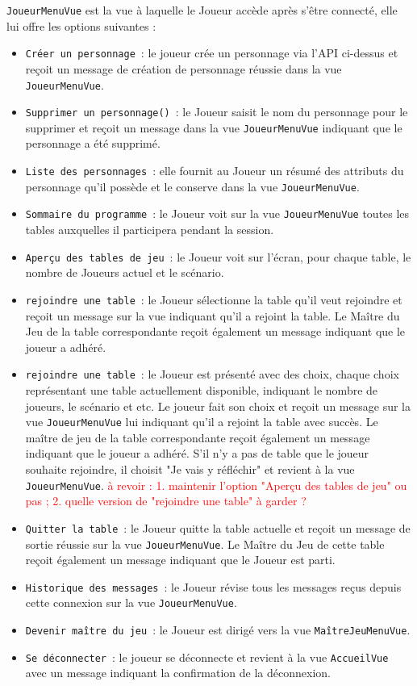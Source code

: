 \documentclass[11pt]{article}
\begin{document}
\texttt{JoueurMenuVue} est la vue à laquelle le Joueur accède après s'être connecté, elle lui offre les options suivantes :
\begin{itemize}[label=, font=\small]
    \item\texttt{Créer un personnage}~: le joueur crée un personnage via l'API ci-dessus et reçoit un message de création de personnage réussie dans la vue \texttt{JoueurMenuVue}.
    \item\texttt{Supprimer un personnage()}~: le Joueur saisit le nom du personnage pour le supprimer et reçoit un message dans la vue \texttt{JoueurMenuVue} indiquant que le personnage a été supprimé.
    \item\texttt{Liste des personnages}~: elle fournit au Joueur un résumé des attributs du personnage qu'il possède et le conserve dans la vue \texttt{JoueurMenuVue}.
    \item\texttt{Sommaire du programme}~: le Joueur voit sur la vue \texttt{JoueurMenuVue} toutes les tables auxquelles il participera pendant la session.
    \item\texttt{Aperçu des tables de jeu}~: le Joueur voit sur l'écran, pour chaque table, le nombre de Joueurs actuel et le scénario.
    \item\texttt{rejoindre une table}~: le Joueur sélectionne la table qu'il veut rejoindre et reçoit un message sur la vue indiquant qu'il a rejoint la table. Le Maître du Jeu de la table correspondante reçoit également un message indiquant que le joueur a adhéré.
    \item\texttt{rejoindre une table}~: le Joueur est présenté avec des choix, chaque choix représentant une table actuellement disponible, indiquant le nombre de joueurs, le scénario et etc. Le joueur fait son choix et reçoit un message sur la vue \texttt{JoueurMenuVue} lui indiquant qu'il a rejoint la table avec succès. Le maître de jeu de la table correspondante reçoit également un message indiquant que le joueur a adhéré. S'il n'y a pas de table que le joueur souhaite rejoindre, il choisit "Je vais y réfléchir" et revient à la vue \texttt{JoueurMenuVue}.
    \textcolor{red}{à revoir : 1. maintenir l'option "Aperçu des tables de jeu" ou pas ; 2. quelle version de "rejoindre une table" à garder ?  }
    \item\texttt{Quitter la table}~: le Joueur quitte la table actuelle et reçoit un message de sortie réussie sur la vue \texttt{JoueurMenuVue}. Le Maître du Jeu de cette table reçoit également un message indiquant que le Joueur est parti.
    \item\texttt{Historique des messages}~: le Joueur révise tous les messages reçus depuis cette connexion sur la vue \texttt{JoueurMenuVue}.
    \item\texttt{Devenir maître du jeu}~: le Joueur est dirigé vers la vue \texttt{MaîtreJeuMenuVue}.   
    \item\texttt{Se déconnecter}~: le joueur se déconnecte et revient à la vue \texttt{AccueilVue} avec un message indiquant la confirmation de la déconnexion.
\end{itemize}
\end{document}
